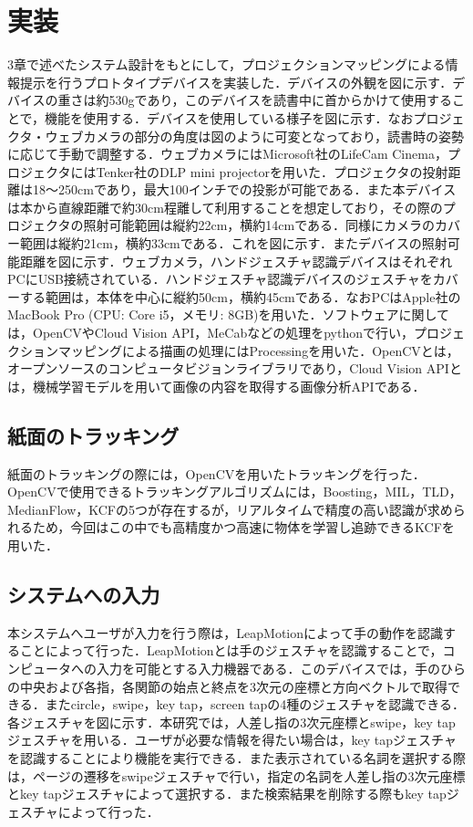 \section{実装}


3章で述べたシステム設計をもとにして，プロジェクションマッピングによる情報提示を行うプロトタイプデバイスを実装した．デバイスの外観を図に示す．デバイスの重さは約530gであり，このデバイスを読書中に首からかけて使用することで，機能を使用する．デバイスを使用している様子を図に示す．なおプロジェクタ・ウェブカメラの部分の角度は図のように可変となっており，読書時の姿勢に応じて手動で調整する．ウェブカメラにはMicrosoft社のLifeCam Cinema，プロジェクタにはTenker社のDLP mini projectorを用いた．プロジェクタの投射距離は18〜250cmであり，最大100インチでの投影が可能である．また本デバイスは本から直線距離で約30cm程離して利用することを想定しており，その際のプロジェクタの照射可能範囲は縦約22cm，横約14cmである．同様にカメラのカバー範囲は縦約21cm，横約33cmである．これを図に示す．またデバイスの照射可能距離を図に示す．ウェブカメラ，ハンドジェスチャ認識デバイスはそれぞれPCにUSB接続されている．ハンドジェスチャ認識デバイスのジェスチャをカバーする範囲は，本体を中心に縦約50cm，横約45cmである．なおPCはApple社のMacBook Pro (CPU: Core i5，メモリ: 8GB)を用いた．ソフトウェアに関しては，OpenCVやCloud Vision API，MeCabなどの処理をpythonで行い，プロジェクションマッピングによる描画の処理にはProcessingを用いた．OpenCVとは，オープンソースのコンピュータビジョンライブラリであり，Cloud Vision APIとは，機械学習モデルを用いて画像の内容を取得する画像分析APIである．


\subsection{紙面のトラッキング}
紙面のトラッキングの際には，OpenCVを用いたトラッキングを行った\cite{opencv}．OpenCVで使用できるトラッキングアルゴリズムには，Boosting，MIL，TLD，MedianFlow，KCFの5つが存在するが，リアルタイムで精度の高い認識が求められるため，今回はこの中でも高精度かつ高速に物体を学習し追跡できるKCFを用いた．

\subsection{システムへの入力}

本システムへユーザが入力を行う際は，LeapMotion\cite{leap}によって手の動作を認識することによって行った．LeapMotionとは手のジェスチャを認識することで，コンピュータへの入力を可能とする入力機器である．このデバイスでは，手のひらの中央および各指，各関節の始点と終点を3次元の座標と方向ベクトルで取得できる．またcircle，swipe，key tap，screen tapの4種のジェスチャを認識できる．各ジェスチャを図に示す．本研究では，人差し指の3次元座標とswipe，key tapジェスチャを用いる．ユーザが必要な情報を得たい場合は，key tapジェスチャを認識することにより機能を実行できる．また表示されている名詞を選択する際は，ページの遷移をswipeジェスチャで行い，指定の名詞を人差し指の3次元座標とkey tapジェスチャによって選択する．また検索結果を削除する際もkey tapジェスチャによって行った．


